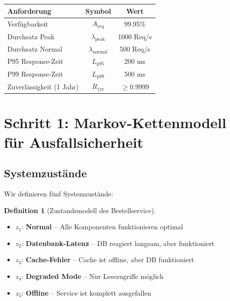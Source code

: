 \documentclass[a4paper,11pt]{article}
\theoremstyle{definition}
\newtheorem{definition}{Definition}
\begin{document}
\begin{table}[H]
    \centering
    \begin{tabular}{|l|c|c|}
        \hline
        \textbf{Anforderung} & \textbf{Symbol} & \textbf{Wert} \\
        \hline
        Verfügbarkeit & $A_{\text{req}}$ & 99.95\% \\
        Durchsatz Peak & $\lambda_{\text{peak}}$ & 1000 Req/s \\
        Durchsatz Normal & $\lambda_{\text{normal}}$ & 500 Req/s \\
        P95 Response-Zeit & $L_{\text{p95}}$ & 200 ms \\
        P99 Response-Zeit & $L_{\text{p99}}$ & 500 ms \\
        Zuverlässigkeit (1 Jahr) & $R_{\text{1yr}}$ & $\geq 0.9999$ \\
        \hline
    \end{tabular}
\end{table}

\section{Schritt 1: Markov-Kettenmodell für Ausfallsicherheit}

\subsection{Systemzustände}

Wir definieren fünf Systemzustände:

\begin{definition}[Zustandsmodell des Bestellservice]
    \label{def:order_service_states}
    
    \begin{itemize}
        \item $z_1$: \textbf{Normal} -- Alle Komponenten funktionieren optimal
        \item $z_2$: \textbf{Datenbank-Latenz} -- DB reagiert langsam, aber funktioniert
        \item $z_3$: \textbf{Cache-Fehler} -- Cache ist offline, aber DB funktioniert
        \item $z_4$: \textbf{Degraded Mode} -- Nur Lesezugriffe möglich
        \item $z_5$: \textbf{Offline} -- Service ist komplett ausgefallen
    \end{itemize}
\end{definition}
\end{document}
